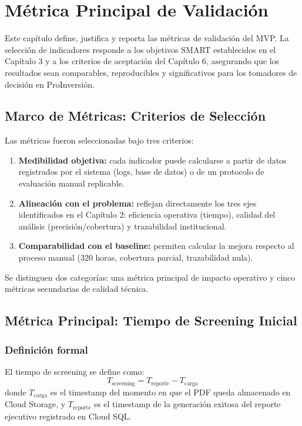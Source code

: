 \chapter{Métrica Principal de Validación}

Este capítulo define, justifica y reporta las métricas de validación del MVP.
La selección de indicadores responde a los objetivos SMART establecidos en el
Capítulo 3 y a los criterios de aceptación del Capítulo 6, asegurando que
los resultados sean comparables, reproducibles y significativos para los
tomadores de decisión en ProInversión.

\section{Marco de Métricas: Criterios de Selección}

Las métricas fueron seleccionadas bajo tres criterios:

\begin{enumerate}
    \item \textbf{Medibilidad objetiva:} cada indicador puede calcularse a
    partir de datos registrados por el sistema (logs, base de datos) o de
    un protocolo de evaluación manual replicable.
    \item \textbf{Alineación con el problema:} reflejan directamente los
    tres ejes identificados en el Capítulo 2: eficiencia operativa
    (tiempo), calidad del análisis (precisión/cobertura) y trazabilidad
    institucional.
    \item \textbf{Comparabilidad con el baseline:} permiten calcular la
    mejora respecto al proceso manual (320 horas, cobertura parcial,
    trazabilidad nula).
\end{enumerate}

Se distinguen dos categorías: una métrica principal de impacto operativo
y cinco métricas secundarias de calidad técnica.

\section{Métrica Principal: Tiempo de Screening Inicial}

\subsection{Definición formal}

El tiempo de screening se define como:
\[
T_{\text{screening}} = T_{\text{reporte}} - T_{\text{carga}}
\]
donde $T_{\text{carga}}$ es el timestamp del momento en que el PDF queda
almacenado en Cloud Storage, y $T_{\text{reporte}}$ es el timestamp de la
generación exitosa del reporte ejecutivo registrado en Cloud SQL.

